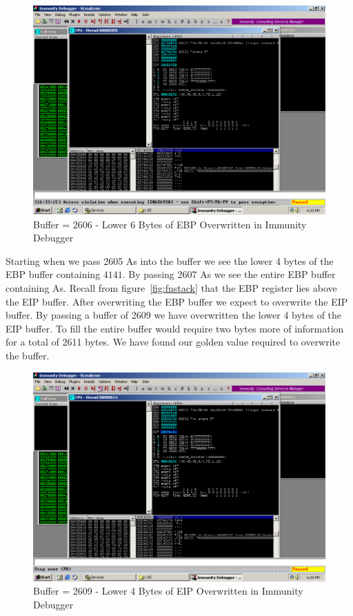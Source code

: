 \documentclass[12pt]{article}
\begin{document}
\begin{figure}[htbp]
    \centering
    \includegraphics[width=5.5in]{images/20160501_buffer2606.png}
    \caption{Buffer = 2606 - Lower 6 Bytes of EBP Overwritten 
      in Immunity Debugger}
    \label{fig:ebpoverwrite}
\end{figure}

Starting when we pass 2605 As into the buffer we see the lower 4 bytes of 
the EBP buffer containing $4141$. By passing 2607 As we see the entire EBP
buffer containing As. Recall from figure~\ref{fig:fnstack} that the EBP 
register lies above the EIP buffer. After overwriting the EBP buffer we 
expect to overwrite the EIP buffer. By passing a buffer of 2609 we have
overwritten the lower 4 bytes of the EIP buffer. To fill the entire buffer
would require two bytes more of information for a total of 2611 bytes. We 
have found our golden value required to overwrite the buffer. 

\begin{figure}[htbp]
    \centering
    \includegraphics[width=5.5in]{images/20160501_buffer2609.png}
    \caption{Buffer = 2609 - Lower 4 Bytes of EIP Overwritten 
      in Immunity Debugger}
    \label{fig:eipoverwrite}
\end{figure}
\end{document}
